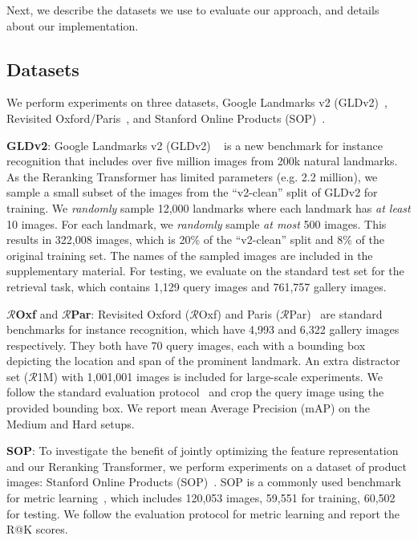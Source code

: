 \vspace{-0.05in}
Next, we describe the datasets we use to evaluate our approach, and details about our implementation.
\vspace{-0.05in}

\subsection{Datasets}
We perform experiments on three datasets, Google Landmarks v2 (GLDv2)~\cite{gldv2}, Revisited Oxford/Paris~\cite{revisited}, and Stanford Online Products (SOP)~\cite{sop2016}. 


\textbf{GLDv2}: Google Landmarks v2 (GLDv2) ~\cite{gldv2} is a new benchmark for instance recognition that includes over five million images from 200k natural landmarks.
As the Reranking Transformer has limited parameters (e.g. 2.2 million), we sample a small subset of the images from the ``v2-clean'' split of GLDv2 for training.
We \textit{randomly} sample 12,000 landmarks where each landmark has \textit{at least} 10 images.
For each landmark, we \textit{randomly} sample \textit{at most} 500 images.
This results in 322,008 images, which is 20\% of the ``v2-clean'' split and 8\% of the original training set. 
The names of the sampled images are included in the supplementary material.
For testing, we evaluate on the standard test set for the retrieval task, which contains 1,129 query images and 761,757 gallery images.

\textbf{$\mathcal{R}$Oxf} and \textbf{$\mathcal{R}$Par}: 
Revisited Oxford ($\mathcal{R}$Oxf) and Paris ($\mathcal{R}$Par)~\cite{revisited} are standard benchmarks for instance recognition, which have 4,993 and 6,322 gallery images respectively. 
They both have 70 query images, each with a bounding box depicting the location and span of the prominent landmark. 
An extra distractor set ($\mathcal{R}$1M) with 1,001,001 images is included for large-scale experiments.
We follow the standard evaluation protocol~\cite{revisited, delg2020} and crop the query image using the provided bounding box.
We report mean Average Precision (mAP) on the Medium and Hard setups.

\textbf{SOP}: To investigate the benefit of jointly optimizing the feature representation and our Reranking Transformer, we perform experiments on a dataset of product images: Stanford Online Products (SOP)~\cite{sop2016}. 
SOP is a commonly used benchmark for metric learning~\cite{margin2017,divide2019,MIC2019, fastap2019,roth2020revisiting, XBM2020, CE2020}, which includes 120,053 images, 59,551 for training, 60,502 for testing. 
We follow the evaluation protocol for metric learning and report the R@K scores.

